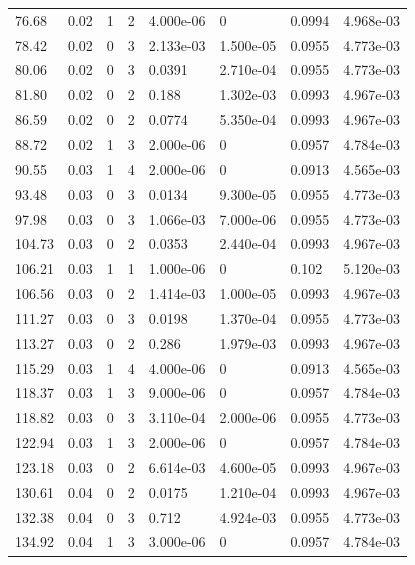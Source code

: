 \documentclass[preview]{standalone}
\begin{document}
{{\begin{tabular}{L{1.2cm}C{1.2cm} C{0.3cm}C{0.5cm} C{1.4cm}C{1.4cm} C{1.4cm}C{1.4cm}}
  76.68  &  0.02  & 1     &  2 &  4.000e-06  & 0  & 0.0994 &  4.968e-03   \\ 
  78.42  &  0.02  & 0     &  3 &  2.133e-03  & 1.500e-05  & 0.0955 &  4.773e-03   \\ 
  80.06  &  0.02  & 0     &  3 &  0.0391  & 2.710e-04  & 0.0955 &  4.773e-03   \\ 
  81.80  &  0.02  & 0     &  2 &  0.188  & 1.302e-03  & 0.0993 &  4.967e-03   \\ 
  86.59  &  0.02  & 0     &  2 &  0.0774  & 5.350e-04  & 0.0993 &  4.967e-03   \\ 
  88.72  &  0.02  & 1     &  3 &  2.000e-06  & 0  & 0.0957 &  4.784e-03   \\ 
  90.55  &  0.03  & 1     &  4 &  2.000e-06  & 0  & 0.0913 &  4.565e-03   \\ 
  93.48  &  0.03  & 0     &  3 &  0.0134  & 9.300e-05  & 0.0955 &  4.773e-03   \\ 
  97.98  &  0.03  & 0     &  3 &  1.066e-03  & 7.000e-06  & 0.0955 &  4.773e-03   \\ 
  104.73  &  0.03  & 0     &  2 &  0.0353  & 2.440e-04  & 0.0993 &  4.967e-03   \\ 
  106.21  &  0.03  & 1     &  1 &  1.000e-06  & 0  & 0.102 &  5.120e-03   \\ 
  106.56  &  0.03  & 0     &  2 &  1.414e-03  & 1.000e-05  & 0.0993 &  4.967e-03   \\ 
  111.27  &  0.03  & 0     &  3 &  0.0198  & 1.370e-04  & 0.0955 &  4.773e-03   \\ 
  113.27  &  0.03  & 0     &  2 &  0.286  & 1.979e-03  & 0.0993 &  4.967e-03   \\ 
  115.29  &  0.03  & 1     &  4 &  4.000e-06  & 0  & 0.0913 &  4.565e-03   \\ 
  118.37  &  0.03  & 1     &  3 &  9.000e-06  & 0  & 0.0957 &  4.784e-03   \\ 
  118.82  &  0.03  & 0     &  3 &  3.110e-04  & 2.000e-06  & 0.0955 &  4.773e-03   \\ 
  122.94  &  0.03  & 1     &  3 &  2.000e-06  & 0  & 0.0957 &  4.784e-03   \\ 
  123.18  &  0.03  & 0     &  2 &  6.614e-03  & 4.600e-05  & 0.0993 &  4.967e-03   \\ 
  130.61  &  0.04  & 0     &  2 &  0.0175  & 1.210e-04  & 0.0993 &  4.967e-03   \\ 
  132.38  &  0.04  & 0     &  3 &  0.712  & 4.924e-03  & 0.0955 &  4.773e-03   \\ 
  134.92  &  0.04  & 1     &  3 &  3.000e-06  & 0  & 0.0957 &  4.784e-03   \\ 

\end{tabular}}}
\end{document}
